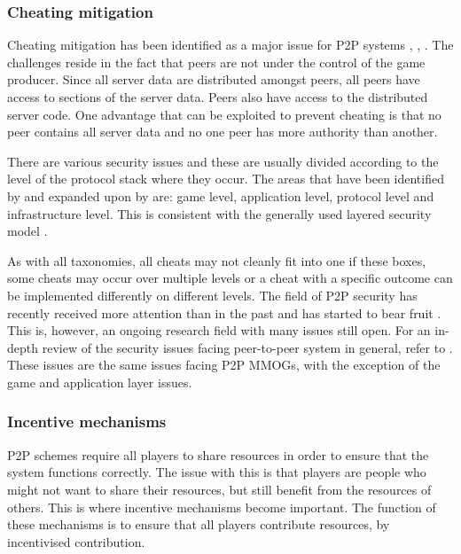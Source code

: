 \documentclass[10pt,a4paper,journal,cspaper,compsoc]{IEEEtran}
\begin{document}
\subsubsection{Cheating mitigation}
\label{key_challenges_cheating}

Cheating mitigation has been identified as a major issue for P2P systems \cite{knutsson_p2p_first}, \cite{challenges_p2p_gaming},
\cite{cheat_proof_event_ordering}. The challenges reside in the fact that peers are not under the control of the game producer. Since all server data
are distributed amongst peers, all peers have access to sections of the server data. Peers also have access to the distributed server code. One
advantage that can be exploited to prevent cheating is that no peer contains all server data and no one peer has more authority than another.

There are various security issues and these are usually divided according to the level of the protocol stack where they occur. The areas that have
been identified by \cite{cheat_proof_event_ordering} and expanded upon by \cite{cheating_taxonomy} are: game level, application level, protocol level
and infrastructure level. This is consistent with the generally used layered security model \cite{distributed_systems_security}.

As with all taxonomies, all cheats may not cleanly fit into one if these boxes, some cheats may occur over multiple levels or a cheat with a specific
outcome can be implemented differently on different levels. The field of P2P security has recently received more attention than in the past and has
started to bear fruit \cite{survey_p2p_game_cheats}. This is, however, an ongoing research field with many issues still open. For an in-depth review
of the security issues facing peer-to-peer system in general, refer to \cite{p2p_security_issues}. These issues are the same issues facing P2P MMOGs,
with the exception of the game and application layer issues.

\subsubsection{Incentive mechanisms}

P2P schemes require all players to share resources in order to ensure that the system functions correctly. The issue with this is that players are
people who might not want to share their resources, but still benefit from the resources of others. This is where incentive mechanisms become
important. The function of these mechanisms is to ensure that all players contribute resources, by incentivised contribution.
\end{document}
